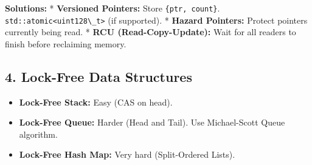 \textbf{Solutions:} * \textbf{Versioned Pointers:} Store
\passthrough{\lstinline!\{ptr, count\}!}.
\passthrough{\lstinline!std::atomic<uint128\_t>!} (if supported). *
\textbf{Hazard Pointers:} Protect pointers currently being read. *
\textbf{RCU (Read-Copy-Update):} Wait for all readers to finish before
reclaiming memory.

\hypertarget{lock-free-data-structures}{%
\subsection{4. Lock-Free Data
Structures}\label{lock-free-data-structures}}

\begin{itemize}
\tightlist
\item
  \textbf{Lock-Free Stack:} Easy (CAS on head).
\item
  \textbf{Lock-Free Queue:} Harder (Head and Tail). Use Michael-Scott
  Queue algorithm.
\item
  \textbf{Lock-Free Hash Map:} Very hard (Split-Ordered Lists).
\end{itemize}
